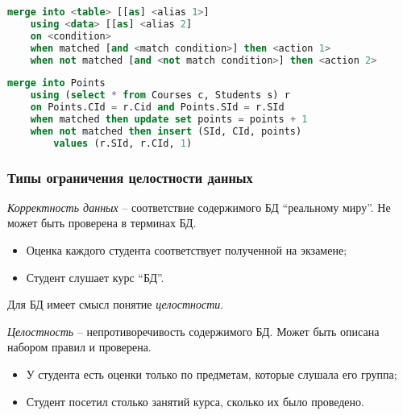 \begin{lstlisting}[language=SQL]
    merge into <table> [[as] <alias 1>]
    using <data> [[as] <alias 2]
    on <condition>
    when matched [and <match condition>] then <action 1>
    when not matched [and <not match condition>] then <action 2>
\end{lstlisting}

\begin{example}
	\enewline
	\begin{lstlisting}[language=SQL]
    merge into Points
    using (select * from Courses c, Students s) r
    on Points.CId = r.Cid and Points.SId = r.SId
    when matched then update set points = points + 1
    when not matched then insert (SId, CId, points)
        values (r.SId, r.CId, 1)
    \end{lstlisting}
\end{example}

\subsubsection{Типы ограничения целостности данных}

\begin{definition}
	\textit{Корректность данных} -- соответствие содержимого БД ``реальному миру''. Не может быть
	проверена в терминах БД.
\end{definition}

\begin{examples}
	\enewline
	\begin{itemize}
		\item Оценка каждого студента соответствует полученной на экзамене;
		\item Студент слушает курс ``БД''.
	\end{itemize}
\end{examples}

Для БД имеет смысл понятие \textit{целостности}.

\begin{definition}
	\textit{Целостность} -- непротиворечивость содержимого БД. Может быть описана набором правил и
	проверена.
\end{definition}

\begin{examples}
	\enewline
	\begin{itemize}
		\item У студента есть оценки только по предметам, которые слушала его группа;
		\item Студент посетил столько занятий курса, сколько их было проведено.
	\end{itemize}
\end{examples}

